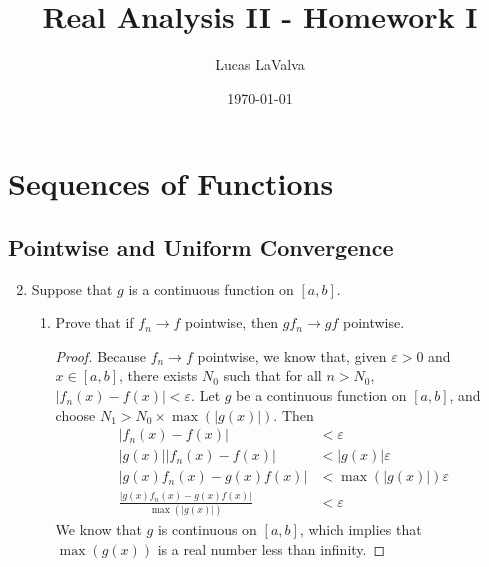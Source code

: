 \documentclass{article}
\title{Real Analysis II - Homework I}
\author{Lucas LaValva}
\date{\today}
\begin{document}
\maketitle

\setcounter{section}{4}

\section{Sequences of Functions}
\subsection{Pointwise and Uniform Convergence}
\begin{enumerate}
      \setcounter{enumi}{1}
      \item Suppose that $g$ is a continuous function on $[a,b]$.
            \begin{enumerate}
                  \item Prove that if $f_n\to f$ pointwise,
                        then $gf_n\to gf$ pointwise.
                        \begin{proof}
                              Because $f_n\to f$ pointwise, we know that,
                              given $\varepsilon > 0$ and $x\in [a,b]$,
                              there exists $N_0$ such that for all
                              $n>N_0$, $\lvert f_n(x)-f(x)\rvert<\varepsilon$.
                              Let $g$ be a continuous function on $[a,b]$, and
                              choose $N_1>N_0\times\max(\lvert g(x)\rvert)$. Then
                              \begin{align*}
                                    \lvert f_n(x)-f(x)\rvert                                         & < \varepsilon                        \\
                                    \lvert g(x)\rvert\lvert f_n(x)-f(x)\rvert                        & < \lvert g(x)\rvert\varepsilon       \\
                                    \lvert g(x)f_n(x)-g(x)f(x)\rvert                                 & < \max(\lvert g(x)\rvert)\varepsilon \\
                                    \frac{\lvert g(x)f_n(x)-g(x)f(x)\rvert}{\max(\lvert g(x)\rvert)} & < \varepsilon
                              \end{align*}
                              We know that $g$ is continuous on $[a,b]$, which implies that
                              $\max(g(x))$ is a real number less than infinity.

\end{proof}
\end{enumerate}
\end{enumerate}
\end{document}
